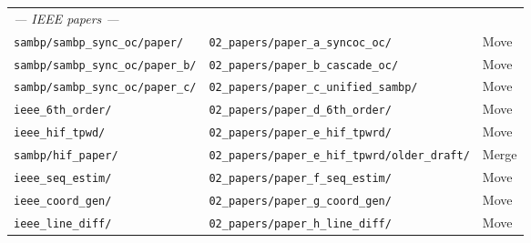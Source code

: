 \documentclass[11pt,a4paper]{article}
\newcommand{\cmd}[1]{\texttt{\small #1}}
\begin{document}
\begin{longtable}{p{5.2cm}p{6.8cm}l}
\multicolumn{3}{l}{\textit{--- IEEE papers ---}} \\
\cmd{sambp/sambp\_sync\_oc/paper/} & \cmd{02\_papers/paper\_a\_syncoc\_oc/} & Move \\
\cmd{sambp/sambp\_sync\_oc/paper\_b/} & \cmd{02\_papers/paper\_b\_cascade\_oc/} & Move \\
\cmd{sambp/sambp\_sync\_oc/paper\_c/} & \cmd{02\_papers/paper\_c\_unified\_sambp/} & Move \\
\cmd{ieee\_6th\_order/} & \cmd{02\_papers/paper\_d\_6th\_order/} & Move \\
\cmd{ieee\_hif\_tpwd/} & \cmd{02\_papers/paper\_e\_hif\_tpwrd/} & Move \\
\cmd{sambp/hif\_paper/} & \cmd{02\_papers/paper\_e\_hif\_tpwrd/older\_draft/} & Merge \\
\cmd{ieee\_seq\_estim/} & \cmd{02\_papers/paper\_f\_seq\_estim/} & Move \\
\cmd{ieee\_coord\_gen/} & \cmd{02\_papers/paper\_g\_coord\_gen/} & Move \\
\cmd{ieee\_line\_diff/} & \cmd{02\_papers/paper\_h\_line\_diff/} & Move \\[4pt]


\end{longtable}
\end{document}

